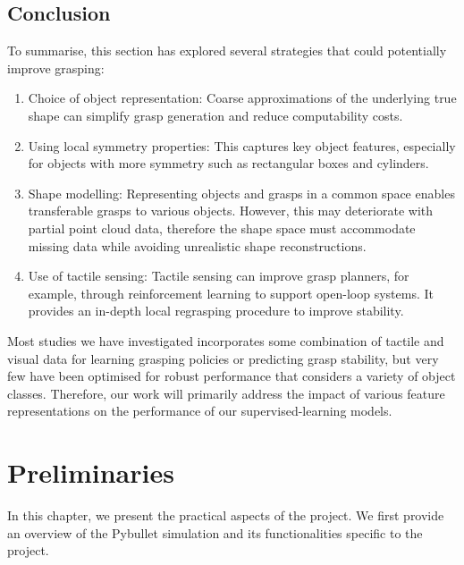 \documentclass[11pt, a4paper]{report}
\begin{document}
\section{Conclusion}
\label{sec:2.4}
To summarise, this section has explored several strategies that could potentially improve grasping:
\begin{enumerate}
    \item Choice of object representation: Coarse approximations of the underlying true shape can simplify grasp generation and reduce computability costs.
    \item Using local symmetry properties: This captures key object features, especially for objects with more symmetry such as rectangular boxes and cylinders.
    \item Shape modelling: Representing objects and grasps in a common space enables transferable grasps to various objects. However, this may deteriorate with partial point cloud data, therefore the shape space must accommodate missing data while avoiding unrealistic shape reconstructions.
    \item Use of tactile sensing: Tactile sensing can improve grasp planners, for example, through reinforcement learning to support open-loop systems. It provides an in-depth local regrasping procedure to improve stability.
\end{enumerate}
Most studies we have investigated incorporates some combination of tactile and visual data for learning grasping policies or predicting grasp stability, but very few have been optimised for robust performance that considers a variety of object classes. Therefore, our work will primarily address the impact of various feature representations on the performance of our supervised-learning models. %



\chapter{Preliminaries}
\label{chap:3}
In this chapter, we present the practical aspects of the project. We first provide an overview of the Pybullet simulation and its functionalities specific to the project.
\end{document}
